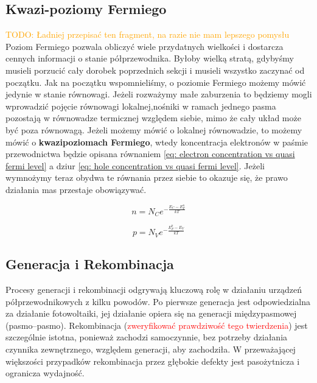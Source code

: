     \subsection{Kwazi-poziomy Fermiego}
        \noindent \textcolor{orange}{TODO: Ładniej przepisać ten fragment, na razie nie mam lepszego pomysłu}
        \newline \newline
        Poziom Fermiego pozwala obliczyć wiele przydatnych wielkości i dostarcza cennych informacji o stanie półprzewodnika. Byłoby wielką stratą, gdybyśmy musieli porzucić cały dorobek poprzednich sekcji i musieli wszystko zaczynać od początku.  
        Jak na początku wspomnieliśmy, o poziomie Fermiego możemy mówić jedynie w stanie równowagi. Jeżeli rozważymy małe zaburzenia to będziemy mogli wprowadzić pojęcie równowagi lokalnej,nośniki w ramach jednego pasma pozostają w równowadze termicznej względem siebie, mimo że cały układ może być poza równowagą. Jeżeli możemy mówić o lokalnej równowadzie, to możemy mówić o \textbf{kwazipoziomach Fermiego}, wtedy koncentracja elektronów w paśmie przewodnictwa będzie opisana równaniem \ref{eq: electron concentration vs quasi fermi level} a dziur \ref{eq: hole concentration vs quasi fermi level}. Jeżeli wymnożymy teraz obydwa te równania przez siebie to okazuje się, że prawo działania mas przestaje obowiązywać.
        \begin{tcolorbox}[colback=black!15!white, colframe=gray!25!black, title=Koncentracja od kwazipoziomów Fermiego]
            \begin{minipage}[t]{0.49\textwidth}
                \begin{equation}
                    n = N_C e^{-\frac{E_C - E_F^n}{kT}} \label{eq: electron concentration vs quasi fermi level}
                \end{equation}
            \end{minipage}
            \hfill
            \begin{minipage}[t]{0.49\textwidth}
                \begin{equation}
                    p = N_V e^{-\frac{E_F^p - E_V}{kT}} \label{eq: hole concentration vs quasi fermi level}
                \end{equation}
            \end{minipage}
        \end{tcolorbox}
    \subsection{Generacja i Rekombinacja}
        Procesy generacji i rekombinacji odgrywają kluczową rolę w działaniu urządzeń półprzewodnikowych z kilku powodów. Po pierwsze generacja jest odpowiedzialna za działanie 
        fotowoltaiki, jej działanie opiera się na generacji międzypasmowej (pasmo–pasmo). Rekombinacja (\textcolor{red}{zweryfikować prawdziwość tego twierdzenia}) jest szczególnie istotna, ponieważ zachodzi samoczynnie, bez potrzeby działania czynnika zewnętrznego, względem generacji, aby zachodziła. W przeważającej większości przypadków rekombinacja przez głębokie defekty jest pasożytnicza i ogranicza wydajność. 
